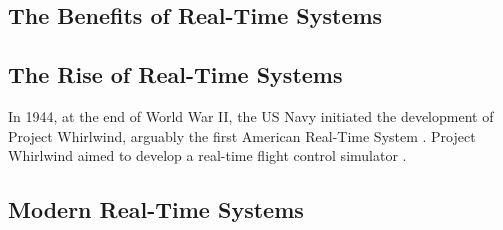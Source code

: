\subsection{The Benefits of Real-Time Systems}



\subsection{The Rise of Real-Time Systems}


In 1944, at the end of World War II, the US Navy initiated the development of Project Whirlwind, arguably the first American Real-Time System \cite{laplante_historical_1995}.
Project Whirlwind aimed to develop a real-time flight control simulator \cite{forrester_whirlwind_1990}.

\subsection{Modern Real-Time Systems}


